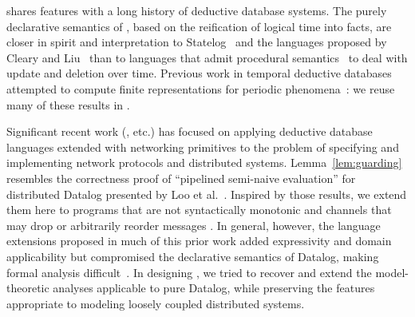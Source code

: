 \lang shares features with a long history of deductive database systems.
The purely declarative semantics of \lang, based on the reification of logical time into
facts, are closer in spirit and interpretation to  Statelog~\cite{statelog} and
the languages proposed by Cleary and Liu~\cite{harmful,deductiveupdates,starlog} than
to languages that admit procedural semantics~\cite{ldl, glue-nail} to deal with update 
and deletion over time.
Previous work in temporal deductive databases attempted to compute finite representations for periodic phenomena~\cite{tdd-infinite}: we reuse many of these results in \lang.

Significant recent work (\cite{boom,Belaramani:2009,Chu:2007,Loo2009-CACM}, etc.) has focused on applying deductive database languages extended with networking 
primitives to the problem of specifying and implementing network protocols and distributed systems.  Lemma~\ref{lem:guarding} resembles the  correctness proof of ``pipelined
semi-naive evaluation'' for distributed Datalog presented by Loo et al.~\cite{loo-sigmod06}.
Inspired by those results, we extend them here to programs that are not syntactically 
monotonic and channels that may drop or arbitrarily reorder messages .
In general, however, the language extensions 
proposed in much of this prior work added
expressivity and domain applicability but compromised the declarative
semantics of Datalog, making formal analysis difficult~\cite{Mao2009, navarro-oper-sem}.
In designing \lang, we tried to recover and extend the model-theoretic analyses applicable
to pure Datalog, while preserving the features appropriate to modeling loosely coupled
distributed systems.

